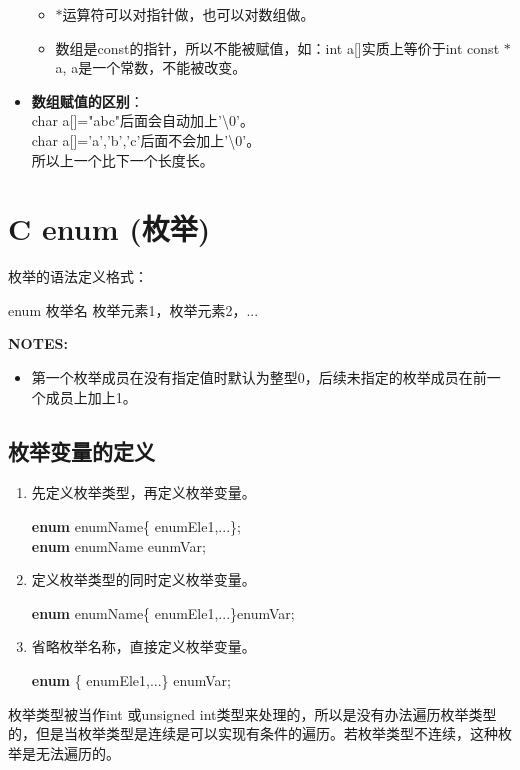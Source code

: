 \documentclass[UTF8]{ctexart}
\begin{document}
\begin{framed}
\begin{itemize}
\begin{itemize}
						\item $*$运算符可以对指针做，也可以对数组做。
						\item 数组是const的指针，所以不能被赋值，如：int a[]实质上等价于int const $*$a, a是一个常数，不能被改变。
					\end{itemize}
					\item \textbf{数组赋值的区别}：\\char a[]="abc"后面会自动加上'\textbackslash0'。\\char a[]={'a','b','c'}后面不会加上'\textbackslash0'。\\所以上一个比下一个长度长。
				\end{itemize}
			\end{framed}

			\clearpage
			\section{C enum (枚举)}
			枚举的语法定义格式：\begin{framed}
				enum 枚举名 {枚举元素1，枚举元素2，...}
			\end{framed}
			\textbf{NOTES:}\begin{itemize}
				\item 第一个枚举成员在没有指定值时默认为整型0，后续未指定的枚举成员在前一个成员上加上1。
			\end{itemize}
			\subsection{枚举变量的定义}
			\begin{enumerate}
				\item 先定义枚举类型，再定义枚举变量。\begin{framed}
					\textbf{enum} enumName\{ enumEle1,...\};\\
					\textbf{enum} enumName eunmVar;
				\end{framed}
				\item 定义枚举类型的同时定义枚举变量。\begin{framed}
					\textbf{enum} enumName\{ enumEle1,...\}enumVar;
				\end{framed}
				\item 省略枚举名称，直接定义枚举变量。\begin{framed}
					\textbf{enum} \{ enumEle1,...\} enumVar;
				\end{framed}
			\end{enumerate}
			枚举类型被当作int 或unsigned int类型来处理的，所以是没有办法遍历枚举类型的，但是当枚举类型是连续是可以实现有条件的遍历。若枚举类型不连续，这种枚举是无法遍历的。
\end{document}
